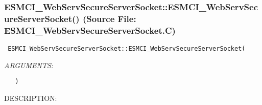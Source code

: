  
\setlength{\oldparskip}{\parskip}
\setlength{\parskip}{1.5ex}
\setlength{\oldparindent}{\parindent}
\setlength{\parindent}{0pt}
\setlength{\oldbaselineskip}{\baselineskip}
\setlength{\baselineskip}{11pt}
 
\def\bv{\begin{verbatim}}
\def\ev{\end{verbatim}}
\def\be{\begin{equation}}
\def\ee{\end{equation}}
\def\bea{\begin{eqnarray}}
\def\eea{\end{eqnarray}}
\def\bi{\begin{itemize}}
\def\ei{\end{itemize}}
\def\bn{\begin{enumerate}}
\def\en{\end{enumerate}}
\def\bd{\begin{description}}
\def\ed{\end{description}}
\def\({\left (}
\def\){\right )}
\def\[{\left [}
\def\]{\right ]}
\def\<{\left  \langle}
\def\>{\right \rangle}
\def\cI{{\cal I}}
\def\diag{\mathop{\rm diag}}
\def\tr{\mathop{\rm tr}}


 
\subsubsection{ESMCI\_WebServSecureServerSocket::ESMCI\_WebServSecureServerSocket() (Source File: ESMCI\_WebServSecureServerSocket.C)}


  
\begin{verbatim} ESMCI_WebServSecureServerSocket::ESMCI_WebServSecureServerSocket(\end{verbatim}{\em ARGUMENTS:}
\begin{verbatim}   )\end{verbatim}
{\sf DESCRIPTION:\\ }


